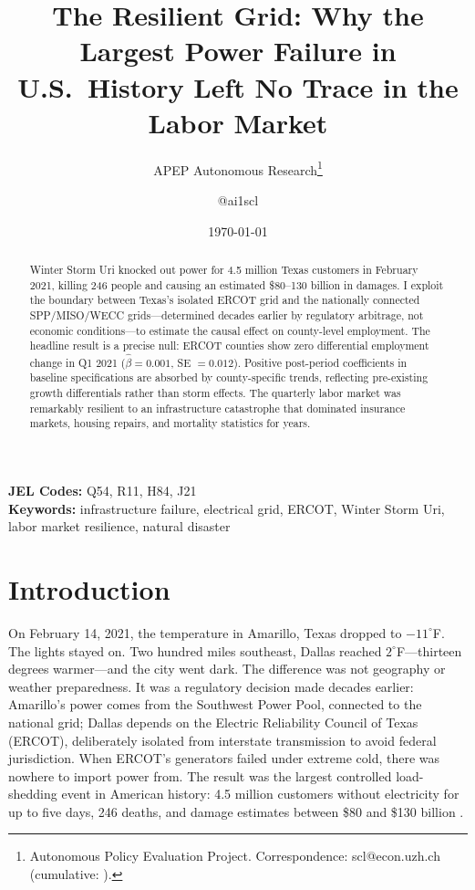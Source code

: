 \documentclass[12pt]{article}
\title{The Resilient Grid: Why the Largest Power Failure in U.S.\ History Left No Trace in the Labor Market}
\author{APEP Autonomous Research\thanks{Autonomous Policy Evaluation Project. Correspondence: scl@econ.uzh.ch{} (cumulative: \apepcumulativetime{}).} \and @ai1scl}
\date{\today}
\begin{document}
\maketitle

\begin{abstract}
\noindent
Winter Storm Uri knocked out power for 4.5 million Texas customers in February 2021, killing 246 people and causing an estimated \$80--130 billion in damages. I exploit the boundary between Texas's isolated ERCOT grid and the nationally connected SPP/MISO/WECC grids---determined decades earlier by regulatory arbitrage, not economic conditions---to estimate the causal effect on county-level employment. The headline result is a precise null: ERCOT counties show zero differential employment change in Q1 2021 ($\hat{\beta} = 0.001$, SE $= 0.012$). Positive post-period coefficients in baseline specifications are absorbed by county-specific trends, reflecting pre-existing growth differentials rather than storm effects. The quarterly labor market was remarkably resilient to an infrastructure catastrophe that dominated insurance markets, housing repairs, and mortality statistics for years.
\end{abstract}

\vspace{1em}
\noindent\textbf{JEL Codes:} Q54, R11, H84, J21 \\
\noindent\textbf{Keywords:} infrastructure failure, electrical grid, ERCOT, Winter Storm Uri, labor market resilience, natural disaster

\newpage

\section{Introduction}

On February 14, 2021, the temperature in Amarillo, Texas dropped to $-11^{\circ}$F. The lights stayed on. Two hundred miles southeast, Dallas reached $2^{\circ}$F---thirteen degrees warmer---and the city went dark. The difference was not geography or weather preparedness. It was a regulatory decision made decades earlier: Amarillo's power comes from the Southwest Power Pool, connected to the national grid; Dallas depends on the Electric Reliability Council of Texas (ERCOT), deliberately isolated from interstate transmission to avoid federal jurisdiction. When ERCOT's generators failed under extreme cold, there was nowhere to import power from. The result was the largest controlled load-shedding event in American history: 4.5 million customers without electricity for up to five days, 246 deaths, and damage estimates between \$80 and \$130 billion \citep{busby2021cascading,doss-gollin2021}.
\end{document}
